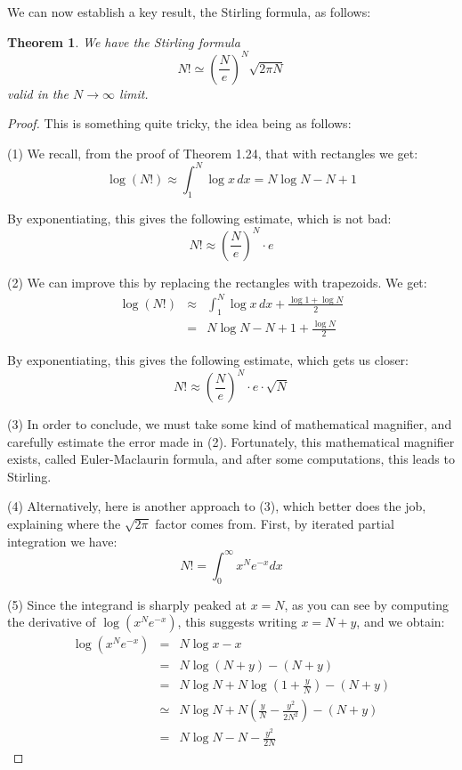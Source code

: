 \documentclass[12pt]{amsbook}
\newtheorem{theorem}{Theorem}[chapter]
\begin{document}
We can now establish a key result, the Stirling formula, as follows:


\begin{theorem}
We have the Stirling formula
$$N!\simeq\left(\frac{N}{e}\right)^N\sqrt{2\pi N}$$
valid in the $N\to\infty$ limit.
\end{theorem}

\begin{proof}
This is something quite tricky, the idea being as follows:

\medskip

(1) We recall, from the proof of Theorem 1.24, that with rectangles we get:
$$\log(N!)
\approx\int_1^N\log x\,dx
=N\log N-N+1$$

By exponentiating, this gives the following estimate, which is not bad:
$$N!\approx\left(\frac{N}{e}\right)^N\cdot e$$

(2) We can improve this by replacing the rectangles with trapezoids. We get:
\begin{eqnarray*}
\log(N!)
&\approx&\int_1^N\log x\,dx+\frac{\log 1+\log N}{2}\\
&=&N\log N-N+1+\frac{\log N}{2}
\end{eqnarray*}

By exponentiating, this gives the following estimate, which gets us closer:
$$N!\approx\left(\frac{N}{e}\right)^N\cdot e\cdot\sqrt{N}$$

(3) In order to conclude, we must take some kind of mathematical magnifier, and carefully estimate the error made in (2). Fortunately, this mathematical magnifier exists, called Euler-Maclaurin formula, and after some computations, this leads to Stirling.

\medskip

(4) Alternatively, here is another approach to (3), which better does the job, explaining where the $\sqrt{2\pi}$ factor comes from. First, by iterated partial integration we have:
$$N!=\int_0^\infty x^Ne^{-x}dx$$

(5) Since the integrand is sharply peaked at $x=N$, as you can see by computing the derivative of $\log(x^Ne^{-x})$, this suggests writing $x=N+y$, and we obtain:
\begin{eqnarray*}
\log(x^Ne^{-x})
&=&N\log x-x\\
&=&N\log(N+y)-(N+y)\\
&=&N\log N+N\log\left(1+\frac{y}{N}\right)-(N+y)\\
&\simeq&N\log N+N\left(\frac{y}{N}-\frac{y^2}{2N^2}\right)-(N+y)\\
&=&N\log N-N-\frac{y^2}{2N}
\end{eqnarray*}


\end{proof}
\end{document}
